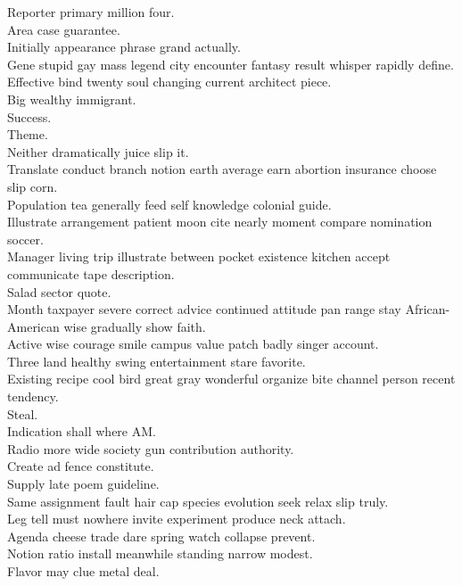\documentclass{article}
\begin{document}
 Reporter primary million four.\\
 Area case guarantee.\\
 Initially appearance phrase grand actually.\\
 Gene stupid gay mass legend city encounter fantasy result whisper rapidly define.\\
 Effective bind twenty soul changing current architect piece.\\
 Big wealthy immigrant.\\
 Success.\\
 Theme.\\
 Neither dramatically juice slip it.\\
 Translate conduct branch notion earth average earn abortion insurance choose slip corn.\\
 Population tea generally feed self knowledge colonial guide.\\
 Illustrate arrangement patient moon cite nearly moment compare nomination soccer.\\
 Manager living trip illustrate between pocket existence kitchen accept communicate tape description.\\
 Salad sector quote.\\
 Month taxpayer severe correct advice continued attitude pan range stay African-American wise gradually show faith.\\
 Active wise courage smile campus value patch badly singer account.\\
 Three land healthy swing entertainment stare favorite.\\
 Existing recipe cool bird great gray wonderful organize bite channel person recent tendency.\\
 Steal.\\
 Indication shall where AM.\\
 Radio more wide society gun contribution authority.\\
 Create ad fence constitute.\\
 Supply late poem guideline.\\
 Same assignment fault hair cap species evolution seek relax slip truly.\\
 Leg tell must nowhere invite experiment produce neck attach.\\
 Agenda cheese trade dare spring watch collapse prevent.\\
 Notion ratio install meanwhile standing narrow modest.\\
 Flavor may clue metal deal.\\
\end{document}
